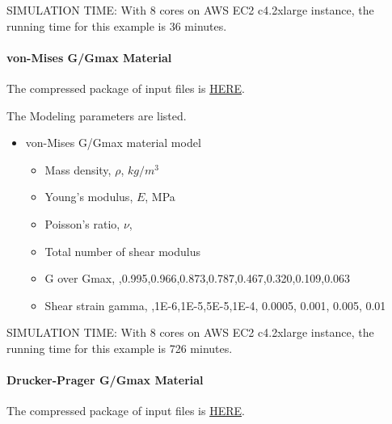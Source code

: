 SIMULATION TIME: With 8 cores on AWS EC2 c4.2xlarge instance, the running time for this example is 36 minutes.


\paragraph{von-Mises G/Gmax Material}
The compressed package of input files is  
\href{https://github.com/yuan-energy/Real-ESSI-Short-Course-Examples/tree/master/short-course-examples/nonlinear_analysis_steps/soil-foundation/vonMisesGoverGmax/vonMisesGoverGmax.tgz?raw=true}{HERE}. 

The Modeling parameters are listed.
\begin{itemize}
  \item von-Mises G/Gmax material model 
  \begin{itemize}
    \item Mass density, $\rho$, \enspace {} $kg/m^3$
    \item Young's modulus, $E$, \enspace {} MPa
    \item Poisson's ratio, $\nu$, \enspace {}
    \item Total number of shear modulus \enspace {}
    \item G over Gmax, \enspace {},0.995,0.966,0.873,0.787,0.467,0.320,0.109,0.063
    \item Shear strain gamma, \enspace {},1E-6,1E-5,5E-5,1E-4, 0.0005, 0.001, 0.005, 0.01
  \end{itemize}
\end{itemize}

SIMULATION TIME: With 8 cores on AWS EC2 c4.2xlarge instance, the running time for this example is 726 minutes.


\paragraph{Drucker-Prager G/Gmax Material}
The compressed package of input files is  
\href{https://github.com/yuan-energy/Real-ESSI-Short-Course-Examples/tree/master/short-course-examples/nonlinear_analysis_steps/soil-foundation/DruckerPragerGoverGmax/DruckerPragerGoverGmax.tgz?raw=true}{HERE}. 


